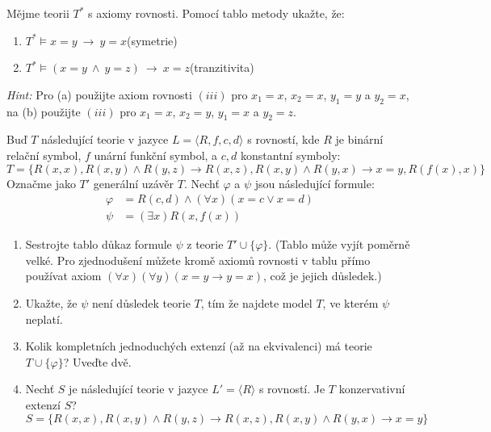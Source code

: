 \documentclass[a4paper,12pt]{article}
\begin{document}
\medskip\begin{problem} Mějme teorii $T^*$ s axiomy rovnosti. Pomocí tablo metody ukažte, že:
\begin{enumerate} 
    \item $T^*\models x=y\ \to\ y=x$\hfill(symetrie)
    \item $T^*\models (x=y\ \wedge\ y=z)\ \to\ x=z$\hfill(tranzitivita)
\end{enumerate}
{\it Hint:} Pro (a) použijte axiom rovnosti $(iii)$ pro $x_1=x$, $x_2=x$, $y_1=y$ a $y_2=x$, \newline
    na (b) použijte $(iii)$ pro $x_1=x$, $x_2=y$, $y_1=x$ a $y_2=z$.
\end{problem}


\medskip\begin{problem} 
Buď $T$ následující teorie v jazyce $L=\langle R,f,c,d\rangle$ s rovností, kde $R$ je binární relační symbol,  $f$ unární funkční symbol, a $c,d$ konstantní symboly:
$$
T=\{R(x,x),R(x,y)\wedge R(y,z)\to R(x,z),R(x,y)\wedge R(y,x)\to x=y,R(f(x),x)\}
$$
Označme jako $T'$ generální uzávěr $T$. Nechť $\varphi$ a $\psi$ jsou následující formule:
\begin{align*}
    \varphi &= R(c,d) \wedge (\forall x)(x=c\vee x=d)\\
    \psi &= (\exists x)R(x,f(x))
\end{align*}
\begin{enumerate}
    \item Sestrojte tablo důkaz formule $\psi$ z teorie $T'\cup\{\varphi\}$. (Tablo může vyjít poměrně velké. Pro zjednodušení můžete kromě axiomů rovnosti v tablu přímo používat axiom $(\forall x)(\forall y)(x=y\to y=x)$, což je jejich důsledek.)
    \item Ukažte, že $\psi$ není důsledek teorie $T$, tím že najdete model $T$, ve kterém $\psi$ neplatí.
    \item Kolik kompletních jednoduchých extenzí (až na ekvivalenci) má teorie $T\cup \{\varphi\}$? Uveďte dvě.
    \item Nechť $S$ je následující teorie v jazyce $L'=\langle R\rangle$ s rovností. Je $T$ konzervativní extenzí $S$?
     $$S=\{R(x,x),R(x,y)\wedge R(y,z)\to R(x,z),R(x,y)\wedge R(y,x)\to x=y\}$$     
\end{enumerate}
\end{problem}
\end{document}
